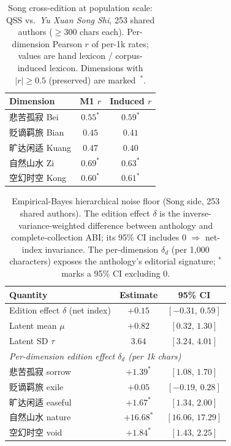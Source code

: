 \documentclass[10pt]{article}
\begin{document}
\begin{table}[H]
\centering\footnotesize
\caption{Song cross-edition at population scale: QSS vs.\ \emph{Yu Xuan Song Shi},
253 shared authors ($\ge$300 chars each). Per-dimension Pearson $r$ of per-1k
rates; values are hand lexicon / corpus-induced lexicon. Dimensions with
$|r|{\ge}0.5$ (preserved) are marked~$^*$.}
\label{tab:songpop}
\begin{tabular}{lcc}
\toprule
Dimension & M1 $r$ & Induced $r$\\
\midrule
悲苦孤寂 Bei & $0.55^*$ & $0.59^*$\\
贬谪羁旅 Bian & $0.45$ & $0.41$\\
旷达闲适 Kuang & $0.47$ & $0.40$\\
自然山水 Zi & $0.69^*$ & $0.63^*$\\
空幻时空 Kong & $0.60^*$ & $0.61^*$\\
\bottomrule
\end{tabular}
\end{table}
\begin{table}[H]
\centering\footnotesize
\caption{Empirical-Bayes hierarchical noise floor (Song side, 253 shared authors).
The edition effect $\delta$ is the inverse-variance-weighted difference between
anthology and complete-collection ABI; its 95\% CI includes $0$
$\Rightarrow$ net-index invariance. The per-dimension $\delta_d$ (per 1{,}000
characters) exposes the anthology's editorial signature; $^*$ marks a 95\% CI
excluding $0$.}
\label{tab:hb}
\begin{tabular}{lcc}
\toprule
Quantity & Estimate & 95\% CI\\
\midrule
Edition effect $\delta$ (net index) & $+0.15$ & $[-0.31,\,0.59]$\\
Latent mean $\mu$ & $+0.82$ & $[0.32,\,1.30]$\\
Latent SD $\tau$ & $3.64$ & $[3.24,\,4.01]$\\
\midrule
\multicolumn{3}{l}{\emph{Per-dimension edition effect $\delta_d$ (per 1k chars)}}\\
悲苦孤寂 sorrow & $+1.39^*$ & $[1.08,\,1.70]$\\
贬谪羁旅 exile & $+0.05$ & $[-0.19,\,0.28]$\\
旷达闲适 easeful & $+1.67^*$ & $[1.34,\,2.00]$\\
自然山水 nature & $+16.68^*$ & $[16.06,\,17.29]$\\
空幻时空 void & $+1.84^*$ & $[1.43,\,2.25]$\\
\bottomrule
\end{tabular}
\end{table}
\end{document}
